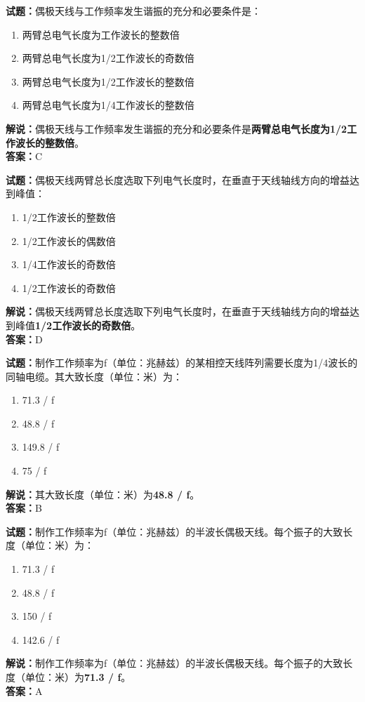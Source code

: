 \documentclass{ctexbook}
\begin{document}
\bigskip


\noindent\textbf{试题：}偶极天线与工作频率发生谐振的充分和必要条件是：
\begin{enumerate}[leftmargin=3em]
\item 两臂总电气长度为工作波长的整数倍
\item 两臂总电气长度为1/2工作波长的奇数倍
\item 两臂总电气长度为1/2工作波长的整数倍
\item 两臂总电气长度为1/4工作波长的整数倍
\end{enumerate}
\noindent\textbf{解说：}偶极天线与工作频率发生谐振的充分和必要条件是\textbf{两臂总电气长度为1/2工作波长的整数倍}。\\\noindent\textbf{答案：}C



\bigskip


\noindent\textbf{试题：}偶极天线两臂总长度选取下列电气长度时，在垂直于天线轴线方向的增益达到峰值：
\begin{enumerate}[leftmargin=3em]
\item 1/2工作波长的整数倍
\item 1/2工作波长的偶数倍
\item 1/4工作波长的奇数倍
\item 1/2工作波长的奇数倍
\end{enumerate}
\noindent\textbf{解说：}偶极天线两臂总长度选取下列电气长度时，在垂直于天线轴线方向的增益达到峰值\textbf{1/2工作波长的奇数倍}。\\\noindent\textbf{答案：}D



\bigskip


\noindent\textbf{试题：}制作工作频率为f（单位：兆赫兹）的某相控天线阵列需要长度为1/4波长的同轴电缆。其大致长度（单位：米）为：
\begin{enumerate}[leftmargin=3em]
\item 71.3 / f
\item 48.8 / f
\item 149.8 / f
\item 75 / f
\end{enumerate}
\noindent\textbf{解说：}其大致长度（单位：米）为\textbf{48.8 / f}。\\\noindent\textbf{答案：}B


\bigskip


\noindent\textbf{试题：}制作工作频率为f（单位：兆赫兹）的半波长偶极天线。每个振子的大致长度（单位：米）为：
\begin{enumerate}[leftmargin=3em]
\item 71.3 / f
\item 48.8 / f
\item 150 / f
\item 142.6 / f
\end{enumerate}
\noindent\textbf{解说：}制作工作频率为f（单位：兆赫兹）的半波长偶极天线。每个振子的大致长度（单位：米）为\textbf{71.3 / f}。\\\noindent\textbf{答案：}A
\end{document}

